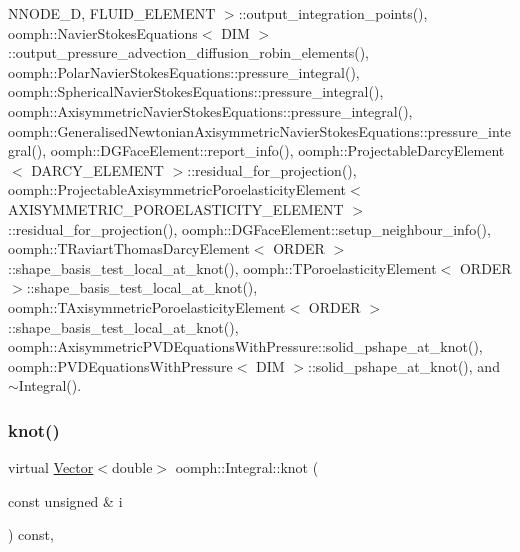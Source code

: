 N\+N\+O\+D\+E\+\_\+D, F\+L\+U\+I\+D\+\_\+\+E\+L\+E\+M\+E\+N\+T $>$\+::output\+\_\+integration\+\_\+points(), oomph\+::\+Navier\+Stokes\+Equations$<$ D\+I\+M $>$\+::output\+\_\+pressure\+\_\+advection\+\_\+diffusion\+\_\+robin\+\_\+elements(), oomph\+::\+Polar\+Navier\+Stokes\+Equations\+::pressure\+\_\+integral(), oomph\+::\+Spherical\+Navier\+Stokes\+Equations\+::pressure\+\_\+integral(), oomph\+::\+Axisymmetric\+Navier\+Stokes\+Equations\+::pressure\+\_\+integral(), oomph\+::\+Generalised\+Newtonian\+Axisymmetric\+Navier\+Stokes\+Equations\+::pressure\+\_\+integral(), oomph\+::\+D\+G\+Face\+Element\+::report\+\_\+info(), oomph\+::\+Projectable\+Darcy\+Element$<$ D\+A\+R\+C\+Y\+\_\+\+E\+L\+E\+M\+E\+N\+T $>$\+::residual\+\_\+for\+\_\+projection(), oomph\+::\+Projectable\+Axisymmetric\+Poroelasticity\+Element$<$ A\+X\+I\+S\+Y\+M\+M\+E\+T\+R\+I\+C\+\_\+\+P\+O\+R\+O\+E\+L\+A\+S\+T\+I\+C\+I\+T\+Y\+\_\+\+E\+L\+E\+M\+E\+N\+T $>$\+::residual\+\_\+for\+\_\+projection(), oomph\+::\+D\+G\+Face\+Element\+::setup\+\_\+neighbour\+\_\+info(), oomph\+::\+T\+Raviart\+Thomas\+Darcy\+Element$<$ O\+R\+D\+E\+R $>$\+::shape\+\_\+basis\+\_\+test\+\_\+local\+\_\+at\+\_\+knot(), oomph\+::\+T\+Poroelasticity\+Element$<$ O\+R\+D\+E\+R $>$\+::shape\+\_\+basis\+\_\+test\+\_\+local\+\_\+at\+\_\+knot(), oomph\+::\+T\+Axisymmetric\+Poroelasticity\+Element$<$ O\+R\+D\+E\+R $>$\+::shape\+\_\+basis\+\_\+test\+\_\+local\+\_\+at\+\_\+knot(), oomph\+::\+Axisymmetric\+P\+V\+D\+Equations\+With\+Pressure\+::solid\+\_\+pshape\+\_\+at\+\_\+knot(), oomph\+::\+P\+V\+D\+Equations\+With\+Pressure$<$ D\+I\+M $>$\+::solid\+\_\+pshape\+\_\+at\+\_\+knot(), and $\sim$\+Integral().

\mbox{\label{classoomph_1_1Integral_a36c9d8e83acfd47254b284bb05733e46}} 
\subsubsection{\texorpdfstring{knot()}{knot()}\hspace{0.1cm}{\footnotesize\ttfamily [2/2]}}
{\footnotesize\ttfamily virtual \hyperlink{classoomph_1_1Vector}{Vector}$<$double$>$ oomph\+::\+Integral\+::knot (\begin{DoxyParamCaption}\item[{const unsigned \&}]{i }\end{DoxyParamCaption}) const\hspace{0.3cm}{\ttfamily [inline]}, {\ttfamily [virtual]}}




